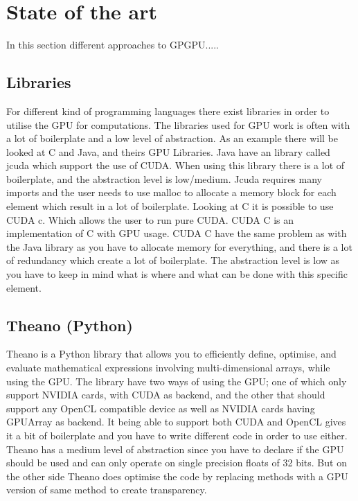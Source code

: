 \section{State of the art} %
\label{sec:state_of_the_art}
In this section different approaches to GPGPU.....
      
\subsection{Libraries}
For different kind of programming languages there exist libraries in order to utilise the GPU for computations.
The libraries used for GPU work is often with a lot of boilerplate and a low level of abstraction.
As an example there will be looked at C and Java, and theirs GPU Libraries.
Java have an library called jcuda which support the use of CUDA.
When using this library there is a lot of boilerplate, and the abstraction level is low/medium\citep{Java_library}. 
Jcuda requires many imports and the user needs to use malloc to allocate a memory block for each element which result in a lot of boilerplate.\citep{Java_malloc}
Looking at C it is possible to use CUDA c. Which allows the user to run pure CUDA.
CUDA C is an implementation of C with GPU usage.
CUDA C have the same problem as with the Java library as you have to allocate memory for everything, and there is a lot of redundancy which create a lot of boilerplate.
The abstraction level is low as you have to keep in mind what is where and what can be done with this specific element.\citep{C_CUDA}
                                                  

\subsection{Theano (Python)}
Theano is a Python library that allows you to efficiently define, optimise, and evaluate mathematical expressions involving multi-dimensional arrays, while using the GPU.
The library have two ways of using the GPU; one of which only support NVIDIA cards, with CUDA as backend, and the other that should support any OpenCL compatible device as well as NVIDIA cards having GPUArray as backend.
It being able to support both CUDA and OpenCL gives it a bit of boilerplate and you have to write different code in order to use either.
Theano has a medium level of abstraction since you have to declare if the GPU should be used and can only operate on single precision floats of 32 bits.
But on the other side Theano does optimise the code by replacing methods with a GPU version of same method to create transparency.\citep{Theano,Theano_GPU}

